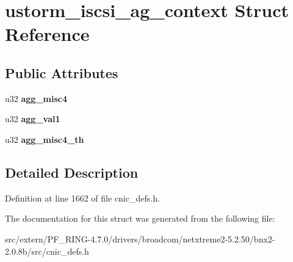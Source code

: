 \hypertarget{structustorm__iscsi__ag__context}{
\section{ustorm\_\-iscsi\_\-ag\_\-context Struct Reference}
\label{structustorm__iscsi__ag__context}
}
\subsection*{Public Attributes}
\begin{DoxyCompactItemize}
\item 
\hypertarget{structustorm__iscsi__ag__context_a8d140d932370823ba3e10bf28e9873dc}{
u32 {\bfseries agg\_\-misc4}}
\label{structustorm__iscsi__ag__context_a8d140d932370823ba3e10bf28e9873dc}

\item 
\hypertarget{structustorm__iscsi__ag__context_a3e5ef0797d8069fc0ab7e8fdc9ad23a1}{
u32 {\bfseries agg\_\-val1}}
\label{structustorm__iscsi__ag__context_a3e5ef0797d8069fc0ab7e8fdc9ad23a1}

\item 
\hypertarget{structustorm__iscsi__ag__context_a24389f5a0bf08f342cf92cfe57508cfd}{
u32 {\bfseries agg\_\-misc4\_\-th}}
\label{structustorm__iscsi__ag__context_a24389f5a0bf08f342cf92cfe57508cfd}

\end{DoxyCompactItemize}


\subsection{Detailed Description}


Definition at line 1662 of file cnic\_\-defs.h.



The documentation for this struct was generated from the following file:\begin{DoxyCompactItemize}
\item 
src/extern/PF\_\-RING-\/4.7.0/drivers/broadcom/netxtreme2-\/5.2.50/bnx2-\/2.0.8b/src/cnic\_\-defs.h\end{DoxyCompactItemize}
